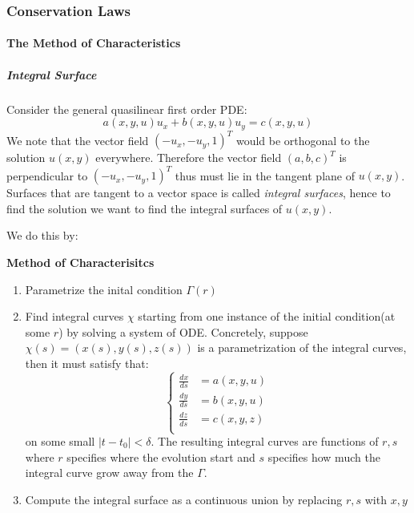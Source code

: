 \subsubsection{Conservation Laws}

\paragraph{The Method of Characteristics}

\subparagraph{Integral Surface}

Consider the general quasilinear first order PDE:
\begin{equation}
a(x,y,u)u_x + b(x,y,u)u_y = c(x,y,u)
\end{equation}
We note that the vector field $( -u_x, -u_y, 1)^T$ would be orthogonal to the solution $u(x,y)$ everywhere. Therefore the vector field $(a, b, c)^T$ is perpendicular to $( -u_x, -u_y, 1)^T$ thus must lie in the tangent plane of $u(x,y)$. Surfaces that are tangent to a vector space is called \textit{integral surfaces}, hence to find the solution we want to find the integral surfaces of $u(x,y)$.

We do this by:

\begin{framed}
\textbf{Method of Characterisitcs}\\
\begin{enumerate}
\item Parametrize the inital condition $\Gamma(r)$
\item Find integral curves $\chi$ starting from one instance of the initial condition(at some $r$) by solving a system of ODE.
Concretely, suppose $\chi(s) = (x(s),y(s),z(s))$ is a parametrization of the integral curves, then it must satisfy that:
\begin{equation}
\begin{cases}
\frac{dx}{ds}&=a(x,y,u) \\
\frac{dy}{ds}&=b(x,y,u) \\
\frac{dz}{ds}&=c(x,y,z) \\
\end{cases}
\end{equation}
on some small $|t -t_0|<\delta$.  The resulting integral curves are functions of $r,s$ where $r$ specifies where the evolution start and $s$ specifies how much the integral curve grow away from the $\Gamma$.


\item Compute the integral surface as a continuous union by replacing $r,s$ with $x,y$
\end{enumerate}
\end{framed}

